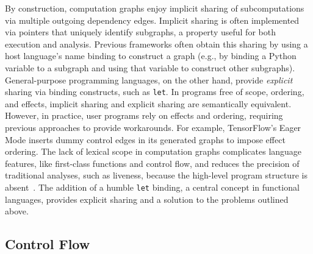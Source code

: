 By construction, computation graphs enjoy implicit sharing of subcomputations
  via multiple outgoing dependency edges.
Implicit sharing is often implemented via pointers that uniquely identify subgraphs,
  a property useful for both execution and analysis.
Previous frameworks often obtain this sharing by using a host
  language's name binding to construct a graph (e.g., by binding a Python variable
  to a subgraph and using that variable to construct other subgraphs).
General-purpose programming languages, on the other hand, provide \textit{explicit}
  sharing via binding constructs, such as \verb|let|.
In programs free of scope, ordering, and effects, implicit sharing
  and explicit sharing are semantically equivalent.
However, in practice, user programs rely on effects and ordering,
  requiring previous approaches to provide workarounds.
For example, TensorFlow's Eager Mode inserts dummy control edges
  in its generated graphs to impose effect ordering.
The lack of lexical scope in computation graphs complicates language features,
  like first-class functions and control flow,
  and reduces the precision of traditional analyses,
  such as liveness,
  because the high-level program structure is absent~\citep{funarg, funarg_sol}.
The addition of a humble \verb|let| binding, a central concept in functional languages,
  provides explicit sharing and a solution to the problems outlined above.

\subsection*{Control Flow}

